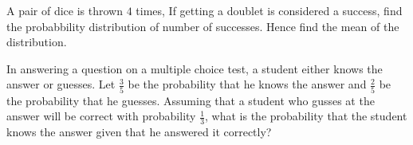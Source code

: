 
\item A pair of dice is thrown $4$ times, If getting a doublet is considered a success, find the probabbility distribution of number of successes. Hence find the mean of the distribution. 

\item In answering a question on a multiple choice test, a student either knows the answer or guesses. Let $\frac{3}{5}$ be the probability that he knows the answer and $\frac{2}{5}$ be the probability that he guesses. Assuming that a student who gusses at the answer will be correct with probability $\frac{1}{3}$, what is the probability that the student knows the answer given that he answered it correctly?

